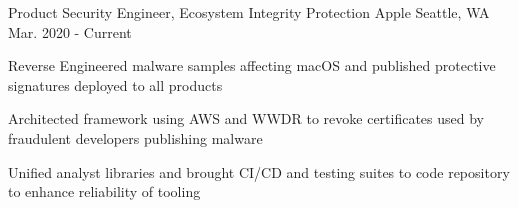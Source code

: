 


\begin{cventries}




\cventry
{Product Security Engineer, Ecosystem Integrity Protection} %
{Apple} %
{Seattle, WA} %
{Mar. 2020 - Current} %
{ %
\begin{cvitems}
\item {Reverse Engineered malware samples affecting macOS and published protective signatures deployed to all products}
\item {Architected framework using AWS and WWDR to revoke certificates used by fraudulent developers publishing malware}
\item {Unified analyst libraries and brought CI/CD and testing suites to code repository to enhance reliability of tooling}
\end{cvitems}
}



\end{cventries}
